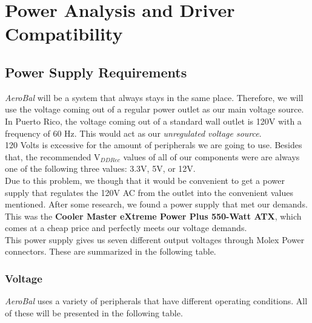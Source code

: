 \section{Power Analysis and Driver Compatibility}

	\subsection{Power Supply Requirements}
		\textit{AeroBal} will be a system that always stays in the same place. Therefore, we will use the voltage coming out of a regular power outlet as our main voltage source. In Puerto Rico, the voltage coming out of a standard wall outlet is 120V with a frequency of 60 Hz\cite{ref:pAnalysis1}. This would act as our \textit{unregulated voltage source}. \\

		120 Volts is excessive for the amount of peripherals we are going to use. Besides that, the recommended V$_{DD Rec}$ values of all of our components were are always one of the following three values: 3.3V, 5V, or 12V. \\

		Due to this problem, we though that it would be convenient to get a power supply that regulates the 120V AC from the outlet into the convenient values mentioned. After some research, we found a power supply that met our demands. This was the \textbf{Cooler Master eXtreme Power Plus 550-Watt ATX}, which comes at a cheap price and perfectly meets our voltage demands. \\ 

		This power supply gives us seven different output voltages through Molex Power connectors. These are summarized in the following table. \\



		\subsubsection{Voltage}

			\textit{AeroBal} uses a variety of peripherals that have different operating conditions. All of these will be presented in the following table. \\




